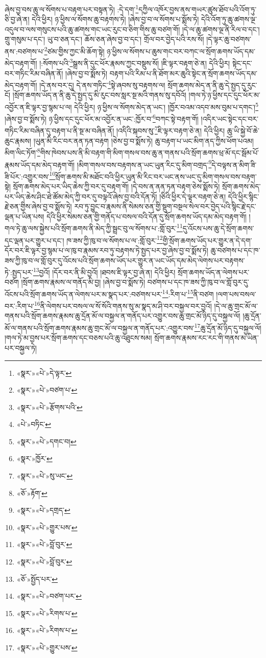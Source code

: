 ཞེས་བྱ་བས་ཆུ་ལ་སོགས་པ་བརྟག་པར་བསྟན་ཏེ། :དེ་དག་\footnote{«སྣར་»«པེ་»དེ་ལྟར་}དཀྱིལ་འཁོར་བྱས་ནས་གཡར་ཚུས་ཐོབ་པའི་འོག་ཏུ་ཅི་བྱ་ཞེ་ན། དེའི་ཕྱིར། ཉ་ཕྱིས་ལ་སོགས་ཆུ་བརྟགས་ཏེ། །ཞེས་བྱ་བ་ལ་སོགས་པ་སྨོས་ཏེ། དེའི་འོག་ཏུ་ཆུ་ཚགས་ལྔ་འདུལ་བ་ལས་གསུངས་པའི་ཆུ་ཚགས་གང་ཡང་རུང་བ་ཅིག་གིས་ཆུ་བཙག་གོ། །དེ་ལ་ཆུ་ཚགས་ལྔ་ནི་རིལ་བ་དང་། གྲུ་གསུམ་པ་དང་། ཡུ་བ་ཅན་དང་། ཆོས་ཅན་ཞེས་བྱ་བ་དང་། གྲོལ་བར་བྱེད་པའི་རས་སོ། །དེ་ལྟར་ཆུ་བཙགས་ནས་:བཙགས་པ་\footnote{«སྣར་»«པེ་»བཙག་པ་}ཙམ་གྱིས་ཀྱང་མི་ཆོག་སྟེ། ཉ་ཕྱིས་ལ་སོགས་པ་ཆུས་གང་བར་བཀང་ལ་སྲོག་ཆགས་ཡོད་དམ་མེད་བརྟག་གོ། །:སོགས་པའི་\footnote{«སྣར་»«པེ་»རྩོགས་པའི་}སྒྲས་ནི་དུང་ཕོར་རྣམས་ཀྱང་བསྡུས་སོ། །ཇི་ལྟར་བརྟག་ཅེ་ན། དེའི་ཕྱིར། སྟེང་དང་བར་གཏིང་རིམ་བཞིན་ནོ། །ཞེས་བྱ་བ་སྨོས་ཏེ། བརྟག་པའི་རིམ་པ་ནི་ཐོག་མར་ཆུའི་སྟེང་ན་སྲོག་ཆགས་ཡོད་དམ་མེད་བརྟག་གོ། །དེ་ནས་བར་དུ། དེ་ནས་གཏིང་\footnote{«པེ་»བཏིང་}སྟེ་ཞབས་སུ་བརྟགས་ལ། སྲོག་ཆགས་མེད་ན་ནི་ཆུ་དེ་སྤྱད་དུ་རུང་ངོ། །སྲོག་ཆགས་ཡོད་ན་ནི་ཆུ་དེ་སྤྱད་དུ་མི་རུང་བས་སླར་སྔ་མའི་གནས་སུ་དབོའོ། །གལ་ཏེ་ཉ་ཕྱིས་དང་དུང་ཕོར་མ་འབྱོར་ན་ཇི་ལྟར་བྱ་སྙམ་པ་ལ། དེའི་ཕྱིར། ཉ་ཕྱིས་ལ་སོགས་མེད་ན་ཡང་། །ཁྱོར་བའམ་འདབ་མས་བུམ་པ་དགང་།\footnote{«སྣར་»«པེ་»དགང་བ།} །ཞེས་བྱ་བ་སྨོས་ཏེ། ཉ་ཕྱིས་དང་དུང་ཕོར་མ་འབྱོར་ན་ཡང་:ཁྱོར་བ་\footnote{«སྣར་»ཁྱོར་}བཀང་སྟེ་བརྟག་གོ། །འདིར་ཡང་སྟེང་དང་བར་གཏིང་རིམ་བཞིན་དུ་བརྟག་པ་ནི་སྔ་མ་བཞིན་ནོ། །འདིའི་སྐབས་སུ་\footnote{«སྣར་»«པེ་»སུ་ཡང་}ཇི་ལྟར་བརྟག་ཅེ་ན། དེའི་ཕྱིར། ཆུ་ཡི་སྐྱེ་བོ་ཆེ་ཆུང་རྣམས། །ཡུན་མི་རིང་བར་ནན་ཏན་བརྟག །ཅེས་བྱ་བ་སྨོས་ཏེ། ཆུ་བརྟག་པ་ཡང་མིག་ནད་ཀྱིས་ཕོག་པའམ། མིག་ལིང་ཏོག་\footnote{«ཅོ་»རྟོག་}གིས་ཁེབས་པས་ནི་མི་བརྟག་གི་མིག་གསལ་བས་ཆུ་ན་གནས་པའི་སྲོག་ཆགས་ཕྲ་མོ་དང་སྦོམ་པོ་རྣམས་ཡོད་དམ་མེད་བརྟག་གོ། །མིག་གསལ་བས་བརྟགས་ན་ཡང་ཡུན་རིང་དུ་མིག་བགྲད་\footnote{«སྣར་»«པེ་»དགྲད་}དེ་བལྟས་ན་མིག་ཟི་ཟི་པོར་:འགྱུར་བས་\footnote{«སྣར་»«པེ་»གྱུར་པས་}སྲོག་ཆགས་མི་མཐོང་བའི་ཕྱིར་ཡུན་མི་རིང་བར་ཡང་ནས་ཡང་དུ་མིག་གསལ་བས་བརྟག་སྟེ། སྲོག་ཆགས་མེད་པར་ཡིད་ཆེས་ཀྱི་བར་དུ་བརྟག་གོ། །དེ་བས་ན་ནན་ཏན་བརྟག་ཅེས་སྨོས་ཏེ། སྲོག་ཆགས་མེད་པར་ཡིད་ཆེས་ཤིང་ཐེ་ཚོམ་མེད་ཀྱི་བར་དུ་བལྟའོ་ཞེས་བྱ་བའི་དོན་ཏོ། །ཅིའི་ཕྱིར་དེ་ལྟར་བརྟག་ཅེ་ན། དེའི་ཕྱིར་སྙིང་རྗེ་ཅན་གྱིས་ཞེས་བྱ་བ་སྨོས་ཏེ། རབ་ཏུ་བྱུང་བ་རྣམས་ནི་སེམས་ཅན་གྱི་སྡུག་བསྔལ་སེལ་བར་བྱེད་པའི་སྙིང་རྗེ་དང་ལྡན་པ་ཡིན་པས། དེའི་ཕྱིར་སེམས་ཅན་གྱི་གནོད་པ་བསལ་བའི་དོན་དུ་སྲོག་ཆགས་ཡོད་དམ་མེད་བརྟག་གོ། །གལ་ཏེ་ཆུ་ལས་སྐྱེས་པའི་སྲོག་ཆགས་ནི་མེད་ཀྱི་སྦྲང་བུ་ལ་སོགས་པ་:གློ་བུར་\footnote{«སྣར་»«པེ་»བློ་བུར་}དུ་འོངས་པས་ཆུ་དེ་སྲོག་ཆགས་དང་ལྡན་པར་གྱུར་པ་དང་། ཁ་ཟས་ཀྱི་ཁུ་བ་ལ་སོགས་པ་ལ་:གློ་བུར་\footnote{«སྣར་»«པེ་»བློ་བུར་}གྱི་སྲོག་ཆགས་ཡོད་པར་གྱུར་ན་དེ་དག་དོར་བར་ཇི་ལྟར་བྱ་སྙམ་པ་ལ་ཁུ་བ་རྣམས་རབ་ཏུ་བརྟགས་ཏེ་སྤྱད་པར་བྱ་ཞེས་བྱ་བ་སྨོས་ཏེ། ཆུ་བཙགས་པ་དང་ཁ་ཟས་ཀྱི་ཁུ་བ་ལ་གློ་བུར་དུ་འོངས་པའི་སྲོག་ཆགས་ཡོད་པར་གྱུར་ན་ཡང་ཡོད་དམ་མེད་ལེགས་པར་བརྟགས་ཏེ་:སྤྱད་པར་\footnote{«ཅོ་»སྤྱོད་པར་}བྱའོ། །དོར་བར་ནི་མི་བྱའོ། །ཐབས་ཇི་ལྟར་བྱ་ཞེ་ན། དེའི་ཕྱིར། སྲོག་ཆགས་ཡོད་ན་ལེགས་པར་བཙག །སྲོག་ཆགས་རྣམས་ལ་གནོད་མི་བྱ། །ཞེས་བྱ་བ་སྨོས་ཏེ། བཙགས་པ་དང་ཁ་ཟས་ཀྱི་ཁུ་བ་ལ་གློ་བུར་དུ་འོངས་པའི་སྲོག་ཆགས་ཡོད་ན་ལེགས་པར་མ་སྣད་པར་:བཙགས་པར་\footnote{«སྣར་»«པེ་»བཙག་པར་}:རིག་པ་\footnote{«སྣར་»«པེ་»རིགས་པ་}ནི་བཙག །ལག་པས་བསལ་བར་:རིག་པ་\footnote{«སྣར་»«པེ་»རིགས་པ་}ནི་ལེགས་པར་བསལ་ལ་སོ་སོའི་གནས་སུ་མ་སྣད་མ་ཤི་བར་བསྐྱལ་བར་བྱའོ། །དེ་ལ་ཆུ་གྲང་མོ་ལ་གནས་པའི་སྲོག་ཆགས་རྣམས་ཆུ་དྲོན་མོ་ལ་བསྐྱལ་ན་གནོད་པར་འགྱུར་བས་ཆུ་གྲང་མོ་ཉིད་དུ་བསྐྱལ་ལོ། །ཆུ་དྲོན་མོ་ལ་གནས་པའི་སྲོག་ཆགས་རྣམས་ཆུ་གྲང་མོ་ལ་བསྐྱལ་ན་གནོད་པར་:འགྱུར་བས་\footnote{«སྣར་»«པེ་»གྱུར་པས་}ཆུ་དྲོན་མོ་ཉིད་དུ་བསྐྱལ་ལོ། །གལ་ཏེ་མ་བྱས་པར་སྲོག་ཆགས་དང་བཅས་པའི་ཆུ་འཐུངས་སམ། སྲོག་ཆགས་རྣམས་རང་རང་གི་གནས་མ་ཡིན་པར་བསྐྱལ་ཏེ། 